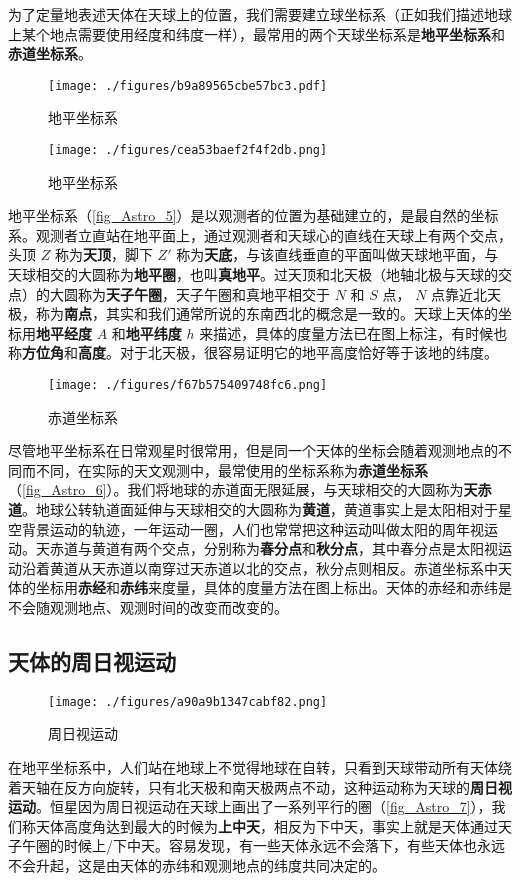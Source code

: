 为了定量地表述天体在天球上的位置，我们需要建立球坐标系（正如我们描述地球上某个地点需要使用经度和纬度一样），最常用的两个天球坐标系是\textbf{地平坐标系}和\textbf{赤道坐标系}。

\begin{figure}[ht]
\centering
\texttt{[image: ./figures/b9a89565cbe57bc3.pdf]}
\caption{地平坐标系} \label{fig_Astro_8}
\end{figure}

\begin{figure}[ht]
\centering
\texttt{[image: ./figures/cea53baef2f4f2db.png]}
\caption{地平坐标系} \label{fig_Astro_5}
\end{figure}

地平坐标系（\autoref{fig_Astro_5}）是以观测者的位置为基础建立的，是最自然的坐标系。观测者立直站在地平面上，通过观测者和天球心的直线在天球上有两个交点，头顶 $Z$ 称为\textbf{天顶}，脚下 $Z'$ 称为\textbf{天底}，与该直线垂直的平面叫做天球地平面，与天球相交的大圆称为\textbf{地平圈}，也叫\textbf{真地平}。过天顶和北天极（地轴北极与天球的交点）的大圆称为\textbf{天子午圈}，天子午圈和真地平相交于 $N$ 和 $S$ 点， $N$ 点靠近北天极，称为\textbf{南点}，其实和我们通常所说的东南西北的概念是一致的。天球上天体的坐标用\textbf{地平经度} $A$ 和\textbf{地平纬度} $h$ 来描述，具体的度量方法已在图上标注，有时候也称\textbf{方位角}和\textbf{高度}。对于北天极，很容易证明它的地平高度恰好等于该地的纬度。

\begin{figure}[ht]
\centering
\texttt{[image: ./figures/f67b575409748fc6.png]}
\caption{赤道坐标系} \label{fig_Astro_6}
\end{figure}

尽管地平坐标系在日常观星时很常用，但是同一个天体的坐标会随着观测地点的不同而不同，在实际的天文观测中，最常使用的坐标系称为\textbf{赤道坐标系}（\autoref{fig_Astro_6}）。我们将地球的赤道面无限延展，与天球相交的大圆称为\textbf{天赤道}。地球公转轨道面延伸与天球相交的大圆称为\textbf{黄道}，黄道事实上是太阳相对于星空背景运动的轨迹，一年运动一圈，人们也常常把这种运动叫做太阳的周年视运动。天赤道与黄道有两个交点，分别称为\textbf{春分点}和\textbf{秋分点}，其中春分点是太阳视运动沿着黄道从天赤道以南穿过天赤道以北的交点，秋分点则相反。赤道坐标系中天体的坐标用\textbf{赤经}和\textbf{赤纬}来度量，具体的度量方法在图上标出。天体的赤经和赤纬是不会随观测地点、观测时间的改变而改变的。

\subsection{天体的周日视运动}

\begin{figure}[ht]
\centering
\texttt{[image: ./figures/a90a9b1347cabf82.png]}
\caption{周日视运动} \label{fig_Astro_7}
\end{figure}

在地平坐标系中，人们站在地球上不觉得地球在自转，只看到天球带动所有天体绕着天轴在反方向旋转，只有北天极和南天极两点不动，这种运动称为天球的\textbf{周日视运动}。恒星因为周日视运动在天球上画出了一系列平行的圈（\autoref{fig_Astro_7}），我们称天体高度角达到最大的时候为\textbf{上中天}，相反为下中天，事实上就是天体通过天子午圈的时候上/下中天。容易发现，有一些天体永远不会落下，有些天体也永远不会升起，这是由天体的赤纬和观测地点的纬度共同决定的。
